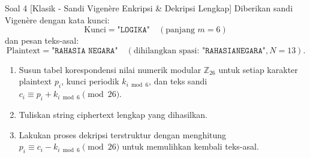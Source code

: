 \documentclass[11pt,a4paper]{article}
\begin{document}

\begin{soalklasik}{Soal 4 [Klasik - Sandi Vigenère Enkripsi \& Dekripsi Lengkap]}
Diberikan sandi Vigenère dengan kata kunci:
\[
\text{Kunci} = \texttt{"LOGIKA"} \quad (\text{panjang } m = 6)
\]
dan pesan teks-asal:
\[
\text{Plaintext} = \texttt{"RAHASIA NEGARA"} \quad (\text{dihilangkan spasi: } \texttt{"RAHASIANEGARA"}, N = 13).
\]
\begin{enumerate}[label=(\alph*)]
    \item Susun tabel korespondensi nilai numerik modular $\mathbb{Z}_{26}$ untuk setiap karakter plaintext $p_i$, kunci periodik $k_{i \bmod 6}$, dan teks sandi $c_i \equiv p_i + k_{i \bmod 6} \pmod{26}$.
    \item Tuliskan string ciphertext lengkap yang dihasilkan.
    \item Lakukan proses dekripsi terstruktur dengan menghitung $p_i \equiv c_i - k_{i \bmod 6} \pmod{26}$ untuk memulihkan kembali teks-asal.
\end{enumerate}
\end{soalklasik}
\end{document}
